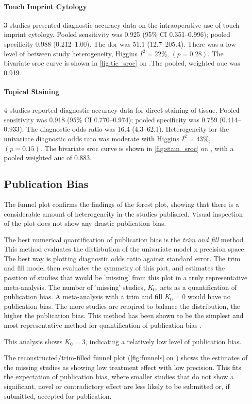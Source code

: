 \paragraph{Touch Imprint Cytology}

3 studies presented diagnostic accuracy data on the intraoperative use of touch imprint cytology.
Pooled sensitivity was 0.925 (95\% CI 0.351--0.996); pooled specificity 0.988 (0.212--1.00).
The \gls{dor} was 51.1 (12.7--205.4).
There was a low level of between study heterogeneity, Higgins $I^2 = 22\%$, $(p=0.28)$.
The bivariate \gls{sroc} curve is shown in \cref{fig:tic_sroc} on .The pooled, weighted \gls{auc} was 0.919.

\paragraph{Topical Staining}

4 studies reported diagnostic accuracy data for direct staining of tissue.
Pooled sensitivity was 0.918 (95\% CI 0.770--0.974); pooled specificity was 0.759 (0.414--0.933).
The diagnostic odds ratio was 16.4 (4.3--62.1).
Heterogeneity for the univariate diagnostic odds rato was moderate with Higgins $I^2 = 43\%$, $(p=0.15)$.
The bivariate \gls{sroc} curve is shown in \cref{fig:stain_sroc} on , with a pooled weighted \gls{auc} of 0.883.


\subsection{Publication Bias}

The funnel plot confirms the findings of the forest plot, showing that there is a considerable amount of heterogeneity in the studies published.
Visual inspection of the plot does not show any drastic publication bias.

The best numerical quantification of publication bias is the \emph{trim and fill} method \cite{duvalTrimFillSimple2000}
This method evaluates the distirbution of the univariate model x precision space.
The best way is plotting diagnostic odds ratio against standard error.
The trim and fill model then evaluates the symmetry of this plot, and estimates the position of studies that would be 'missing' from this plot in a truly representative meta-analysis.
The number of 'missing' studies, $K_0$, acts as a quantification of publication bias.
A meta-analysis with a trim and fill $K_0 = 0$ would have no publication bias.
The more studies are reuqired to balance the distribution, the higher the publication bias.
This method has been shown to be the simplest and most representative method for quantification of publication bias \cite{burknerTestingPublicationBias2014}.


This analysis shows $K_0 = 3$, indicating a relatively low level of publication bias.

The reconstructed/trim-filled funnel plot (\cref{fig:funnels} on ) shows the estimates of the missing studies as showing low treatment effect with low precision.
This fits the expectation of publication bias, where smaller studies that do not show a significant, novel or contradictory effect are less likely to be submitted or, if submitted, accepted for publication.

